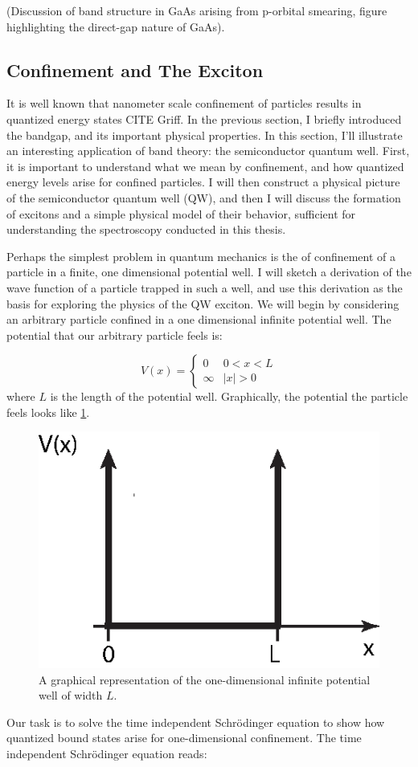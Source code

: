 (Discussion of band structure in GaAs arising from p-orbital smearing, figure highlighting the direct-gap nature of GaAs).

\subsection{Confinement and The Exciton}
\indent It is well known that nanometer scale confinement of particles results in quantized energy states CITE Griff. In the previous section, I briefly introduced the bandgap, and its important physical properties. In this section, I'll illustrate an interesting application of band theory: the semiconductor quantum well. First, it is important to understand what we mean by confinement, and how quantized energy levels arise for confined particles. I will then construct a physical picture of the semiconductor quantum well (QW), and then I will discuss the formation of excitons and a simple physical model of their behavior, sufficient for understanding the spectroscopy conducted in this thesis.

\indent Perhaps the simplest problem in quantum mechanics is the of confinement of a particle in a finite, one dimensional potential well. I will sketch a derivation of the wave function of a particle trapped in such a well, and use this derivation as the basis for exploring the physics of the QW exciton. We will begin by considering an arbitrary particle confined in a one dimensional infinite potential well. The potential that our arbitrary particle feels is:

\[ V(x) = \begin{cases} 
      0 & 0 < x < L \\
      \infty & |x| > 0 
   \end{cases}
\]
where $L$ is the length of the potential well. Graphically, the potential the particle feels looks like \ref{infp}.

\begin{figure}[h!]
\centering
\includegraphics[width = .6\textwidth]{infpotential.eps}
\caption{A graphical representation of the one-dimensional infinite potential well of width $L$.}
\label{infp}
\end{figure}
Our task is to solve the time independent Schr\"{o}dinger equation to show how quantized bound states arise for one-dimensional confinement. The time independent Schr\"{o}dinger equation reads:

